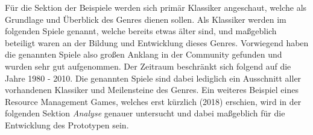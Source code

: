 Für die Sektion der Beispiele werden sich primär Klassiker angeschaut, welche als Grundlage und Überblick des Genres dienen sollen.
Als Klassiker werden im folgenden Spiele genannt, welche bereits etwas älter sind, und maßgeblich beteiligt waren an der Bildung und Entwicklung dieses Genres. Vorwiegend haben die genannten Spiele also großen Anklang in der Community gefunden und wurden sehr gut aufgenommen. Der Zeitraum beschränkt sich folgend auf die Jahre 1980 - 2010. Die genannten Spiele sind dabei lediglich ein Ausschnitt aller vorhandenen Klassiker und Meilensteine des Genres. Ein weiteres Beispiel eines Resource Management Games, welches erst kürzlich (2018) erschien, wird in der folgenden Sektion \textit{Analyse} genauer untersucht und dabei maßgeblich für die Entwicklung des Prototypen sein.




